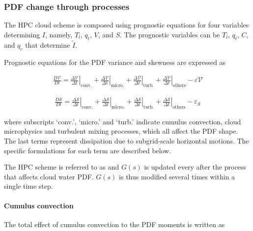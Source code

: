 \hypertarget{pdf-change-through-processes}{%
\subsubsection{PDF change through
processes}\label{pdf-change-through-processes}}

The HPC cloud scheme is composed using prognostic equations for four
variables determining \(I\), namely, \(T_l\), \(q_t\), \(V\), and \(S\).
The prognostic variables can be \(T_l\), \(q_t\), \(C\), and \(q_c\)
that determine \(\tilde {I}\).

Prognostic equations for the PDF variance and skewness are expressed as

\begin{eqnarray}
\frac{D \mathcal{V}}{D t}=\left.\frac{\Delta \mathcal{V}}{\Delta t}\right|_{\mathrm{conv.}}+\left.\frac{\Delta \mathcal{V}}{\Delta t}\right|_{\mathrm{micro.}}+\left.\frac{\Delta \mathcal{V}}{\Delta t}
\right|_{\mathrm{turb.}}+\left.\frac{\Delta \mathcal{V}}{\Delta t}
\right|_{\mathrm{others}}-\varepsilon \mathcal{V}
\end{eqnarray}

\begin{eqnarray}
\frac{D \mathcal{S}}{D t}=\left.\frac{\Delta \mathcal{S}}{\Delta t}\right|_{\mathrm{conv.}}+\left.\frac{\Delta \mathcal{S}}{\Delta t}\right|_{\text {micro.}}+\left.\frac{\Delta \mathcal{S}}{\Delta t}
\right|_{\mathrm{turb.}}+\left.\frac{\Delta \mathcal{S}}{\Delta t}\right|_{\text {others}}-\varepsilon_{\mathcal{S}}
\end{eqnarray}

where subscripts `conv.', `micro.' and `turb.' indicate cumulus
convection, cloud microphysics and turbulent mixing processes, which all
affect the PDF shape. The last terms represent dissipation due to
subgrid-scale horizontal motions. The specific formulations for each
term are described below.

The HPC scheme is referred to as and \(G(s)\) is updated every after the
process that affects cloud water PDF. \(G(s)\) is thus modified several
times within a single time step.

\hypertarget{cumulus-convection}{%
\paragraph{Cumulus convection}\label{cumulus-convection}}

The total effect of cumulus convection to the PDF moments is written as

